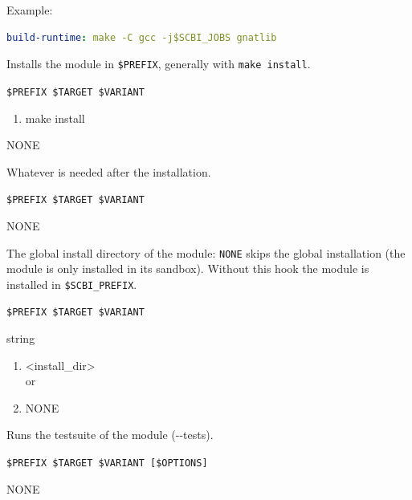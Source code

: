 \documentclass[a4paper,12pt,twoside]{article}
\newcommand{\code}[1]{\texttt{#1}}
\newcommand{\ddash}{-{}-}
\begin{document}
\begin{description}[font=\large\texttt]
	Example:
	\begin{lstlisting}[language={yaml}]
build-runtime: make -C gcc -j$SCBI_JOBS gnatlib
\end{lstlisting}

	\item[install {[}<variant>{]}] Installs the module in \code{\$PREFIX}, generally with \code{make install}.
	\begin{description}[font=\textit,style=standard]
		\item[parameter] \tabto{2cm} \code{\$PREFIX \$TARGET \$VARIANT}
		\begin{enumerate}
			\item make install
		\end{enumerate}
		\item[return] \tabto{2cm} NONE
	\end{description}

	\item[wrapup {[}<variant>{]}] Whatever is needed after the installation.
	\begin{description}[font=\textit,style=standard]
		\item[parameter] \tabto{2cm} \code{\$PREFIX \$TARGET \$VARIANT}
		\item[return] \tabto{2cm} NONE
	\end{description}

	\item[prefix {[}<variant>{]}] The global install directory of the module: \code{NONE} skips the global installation (the module is only installed in its sandbox). Without this hook the module is installed in \code{\$SCBI\_PREFIX}.
	\label{global-install}
	\begin{description}[font=\textit,style=standard]
		\item[parameter] \tabto{2cm} \code{\$PREFIX \$TARGET \$VARIANT}
		\item[return] \tabto{2cm} string
		\begin{enumerate}
			\item <install\_dir>
			\\ or
			\item NONE
		\end{enumerate}
	\end{description}

	\item[tests {[}<variant>{]}] Runs the testsuite of the module (\ddash{}tests).
	\label{tests-hook}
	\begin{description}[font=\textit,style=standard]
		\item[parameter] \tabto{2cm} \code{\$PREFIX \$TARGET \$VARIANT [\$OPTIONS]}
		\item[return] \tabto{2cm} NONE
	\end{description}


\end{description}
\end{document}
